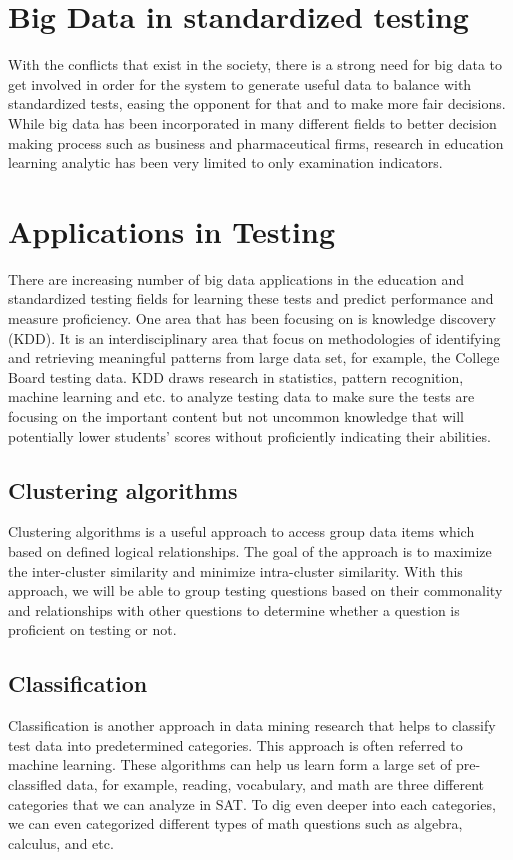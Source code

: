 \documentclass[sigconf]{acmart}
\begin{document}
\section{Big Data in standardized testing}
With the conflicts that exist in the society, there is a strong need for big data to get involved in order for the system to generate useful data to balance with standardized tests, easing the opponent for that and to make more fair decisions. While big data has been incorporated in many different fields to better decision making process such as business and pharmaceutical firms, research in education learning analytic has been very limited to only examination indicators. 

\section{Applications in Testing}
There are increasing number of big data applications in the education and standardized testing fields for learning these tests and predict performance and measure proficiency. One area that has been focusing on is knowledge discovery (KDD). It is an interdisciplinary area that focus on methodologies of identifying and retrieving meaningful patterns from large data set, for example, the College Board  testing data. KDD draws research in statistics, pattern recognition, machine learning and etc. to analyze testing data to make sure the tests are focusing on the important content but not uncommon knowledge that will potentially lower students' scores without proficiently indicating their abilities.\cite{Daniel2015}

\subsection{Clustering algorithms}
Clustering algorithms is a useful approach to access group data items which based on  defined logical relationships.\cite{Daniel2015} The goal of the approach is to maximize the inter-cluster similarity and minimize intra-cluster similarity. With this approach, we will be able to group testing questions based on their commonality and relationships with other questions to determine whether a question is proficient on testing or not.

\subsection{Classification}
Classification is another approach in data mining research that helps to classify test data into predetermined categories. This approach is often referred to machine learning. These algorithms can help us learn form a large set of pre-classifled data, for example, reading, vocabulary, and math are three different categories that we can analyze in SAT.\cite{Daniel2015} To dig even deeper into each categories, we can even categorized different types of math questions such as algebra, calculus, and etc. 
\end{document}
